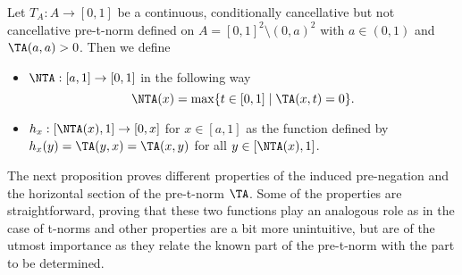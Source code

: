 \begin{definition}
	Let $T_A: A \to [0,1]$ be a continuous, conditionally cancellative but not cancellative pre-t-norm defined on $A=[0,1]^2 \setminus (0,a)^2$ with $a \in (0,1)$ and $\TA(a,a)>0$. Then we define
	\begin{itemize}
		\item $\NTA:[a,1] \to [0,1]$ in the following way
		$$\NTA(x)=\max \{t \in [0,1] \mid \TA(x,t)=0\}.$$
		\item $h_x : [\NTA(x),1] \to [0,x]$ for $ x \in [a,1]$ as the function defined by $h_x(y)=\TA(y,x)=\TA(x,y)$ for all $y \in [\NTA(x),1]$.
	\end{itemize}
\end{definition}

The next proposition proves different properties of the induced pre-negation and the horizontal section of the pre-t-norm $\TA$. Some of the properties are straightforward, proving that these two functions play an analogous role as in the case of t-norms and other properties are a bit more unintuitive, but are of the utmost importance as they relate the known part of the pre-t-norm with the part to be determined.


